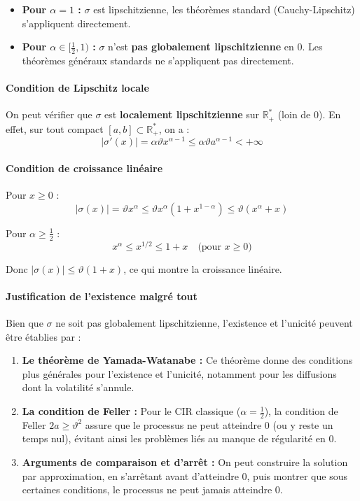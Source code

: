 \documentclass[12pt,a4paper]{article}
\theoremstyle{definition}
\theoremstyle{remark}
\newcommand{\R}{\mathbb{R}}
\begin{document}
\begin{itemize}
\item \textbf{Pour $\alpha = 1$ :} $\sigma$ est lipschitzienne, les théorèmes standard (Cauchy-Lipschitz) s'appliquent directement.
\item \textbf{Pour $\alpha \in [\frac{1}{2}, 1)$ :} $\sigma$ n'est \textbf{pas globalement lipschitzienne} en $0$. Les théorèmes généraux standards ne s'appliquent pas directement.
\end{itemize}

\paragraph{Condition de Lipschitz locale}

On peut vérifier que $\sigma$ est \textbf{localement lipschitzienne} sur $\R_+^*$ (loin de $0$). En effet, sur tout compact $[a,b] \subset \R_+^*$, on a :
\[
|\sigma'(x)| = \alpha\vartheta x^{\alpha-1} \leq \alpha\vartheta a^{\alpha-1} < +\infty
\]

\paragraph{Condition de croissance linéaire}

Pour $x \geq 0$ :
\[
|\sigma(x)| = \vartheta x^\alpha \leq \vartheta x^\alpha (1 + x^{1-\alpha}) \leq \vartheta(x^\alpha + x)
\]

Pour $\alpha \geq \frac{1}{2}$ :
\[
x^\alpha \leq x^{1/2} \leq 1 + x \quad \text{(pour } x \geq 0\text{)}
\]

Donc $|\sigma(x)| \leq \vartheta(1 + x)$, ce qui montre la croissance linéaire.

\paragraph{Justification de l'existence malgré tout}

Bien que $\sigma$ ne soit pas globalement lipschitzienne, l'existence et l'unicité peuvent être établies par :

\begin{enumerate}
\item \textbf{Le théorème de Yamada-Watanabe :} Ce théorème donne des conditions plus générales pour l'existence et l'unicité, notamment pour les diffusions dont la volatilité s'annule.

\item \textbf{La condition de Feller :} Pour le CIR classique ($\alpha = \frac{1}{2}$), la condition de Feller $2a \geq \vartheta^2$ assure que le processus ne peut atteindre $0$ (ou y reste un temps nul), évitant ainsi les problèmes liés au manque de régularité en $0$.

\item \textbf{Arguments de comparaison et d'arrêt :} On peut construire la solution par approximation, en s'arrêtant avant d'atteindre $0$, puis montrer que sous certaines conditions, le processus ne peut jamais atteindre $0$.
\end{enumerate}
\end{document}
